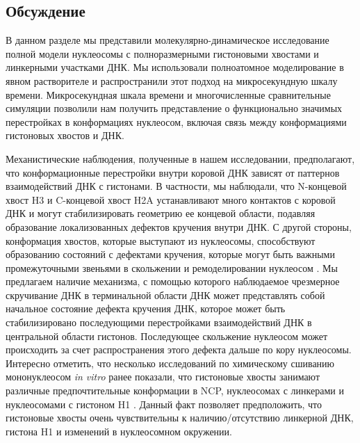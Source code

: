 \subsection{Обсуждение}
    В данном разделе мы представили молекулярно-динамическое исследование полной модели нуклеосомы с полноразмерными гистоновыми хвостами и линкерными участками ДНК. Мы использовали полноатомное моделирование в явном растворителе и распространили этот подход на микросекундную шкалу времени. Микросекундная шкала времени и многочисленные сравнительные симуляции позволили нам получить представление о функционально значимых перестройках в конформациях нуклеосом, включая связь между конформациями гистоновых хвостов и ДНК.

    Механистические наблюдения, полученные в нашем исследовании, предполагают, что конформационные перестройки внутри коровой ДНК зависят от паттернов взаимодействий ДНК с гистонами. В частности, мы наблюдали, что N-концевой хвост H3 и C-концевой хвост H2A устанавливают много контактов с коровой ДНК и могут стабилизировать геометрию ее концевой области, подавляя образование локализованных дефектов кручения внутри ДНК. С другой стороны, конформация хвостов, которые выступают из нуклеосомы, способствуют образованию состояний с дефектами кручения, которые могут быть важными промежуточными звеньями в скольжении и ремоделировании нуклеосом \cite{mueller-planitz_nucleosome_2013}. Мы предлагаем наличие механизма, с помощью которого наблюдаемое чрезмерное скручивание ДНК в терминальной области ДНК может представлять собой начальное состояние дефекта кручения ДНК, которое может быть стабилизировано последующими перестройками взаимодействий ДНК в центральной области гистонов. Последующее скольжение нуклеосом может происходить за счет распространения этого дефекта дальше по кору нуклеосомы. Интересно отметить, что несколько исследований по химическому сшиванию мононуклеосом \textit{in vitro} ранее показали, что гистоновые хвосты занимают различные предпочтительные конформации в NCP, нуклеосомах с линкерами и нуклеосомами с гистоном H1 \cite{lee_linker_1998,angelov_preferential_2001}. Данный факт позволяет предположить, что гистоновые хвосты очень чувствительны к наличию/отсутствию линкерной ДНК, гистона H1 и изменений в нуклеосомном окружении.
    
